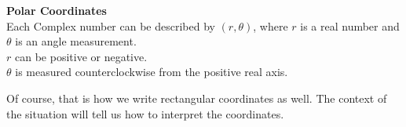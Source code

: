 \documentclass{ximera}
\begin{document}
\begin{definition}   \textbf{\textcolor{green!50!black}{Polar Coordinates}} \\

Each Complex number can be described by $(r, \theta)$, where $r$ is a real number and $\theta$ is an angle measurement.  \\


$r$ can be positive or negative. \\
$\theta$ is measured counterclockwise from the positive real axis. \\

\end{definition}


Of course, that is how we write rectangular coordinates as well.  The context of the situation will tell us how to interpret the coordinates.
\end{document}
